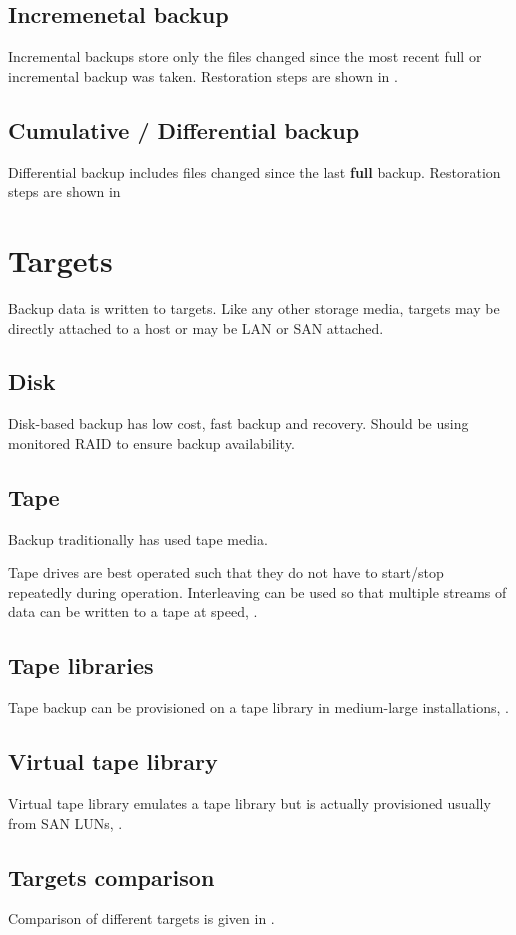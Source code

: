 \subsection{Incremenetal backup}\label{incremenetal-backup}

Incremental backups store only the files changed since the most recent
full or incremental backup was taken. Restoration steps are shown in .

\subsection{Cumulative / Differential
backup}\label{cumulative-differential-backup}

Differential backup includes files changed since the last \textbf{full}
backup. Restoration steps are shown in

\section{Targets}\label{targets}

Backup data is written to targets. Like any other storage media, targets
may be directly attached to a host or may be LAN or SAN attached.

\subsection{Disk}\label{disk}

Disk-based backup has low cost, fast backup and recovery. Should be
using monitored RAID to ensure backup availability.

\subsection{Tape}\label{tape}

Backup traditionally has used tape media.

Tape drives are best operated such that they do not have to start/stop
repeatedly during operation. Interleaving can be used so that multiple
streams of data can be written to a tape at speed, .

\subsection{Tape libraries}\label{tape-libraries}

Tape backup can be provisioned on a tape library in medium-large
installations, .

\subsection{Virtual tape library}\label{virtual-tape-library}

Virtual tape library emulates a tape library but is actually provisioned
usually from SAN LUNs, .

\subsection{Targets comparison}\label{targets-comparison}

Comparison of different targets is given in .
